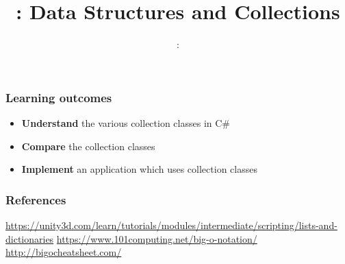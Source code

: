 \usepackage{../../beamerthemeFalmouthGamesAcademy}
\usepackage{multimedia}
\graphicspath{ {../../} }


\usepackage[normalem]{ulem}
\usepackage{wasysym}
\usepackage{listings}
\usepackage{pdfpages}
\usepackage[T1]{fontenc} 

\usetikzlibrary{arrows,automata}




	\title{\sessionnumber: Data Structures and Collections}
	\subtitle{\modulecode: \moduletitle}
	
	\frame{\titlepage}
	
	\begin{frame}
	\frametitle{Learning outcomes}
	\begin{itemize}
		\item \textbf{Understand} the various collection classes in C\#
		\item \textbf{Compare} the collection classes
		\item \textbf{Implement} an application which uses collection classes
	\end{itemize}
\end{frame}











%

\begin{frame}
\frametitle{References}
\url{https://unity3d.com/learn/tutorials/modules/intermediate/scripting/lists-and-dictionaries}
\url{https://www.101computing.net/big-o-notation/}
\url{http://bigocheatsheet.com/}
\end{frame}



